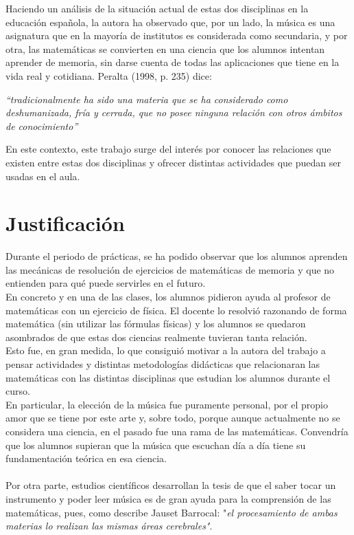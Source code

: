\documentclass[a4paper, openright, 11pt, titlepage]{report}
\theoremstyle{definition}\newtheorem{defin}[propo]{Definition}
\theoremstyle{definition}\newtheorem{obser}[propo]{Remark}
\theoremstyle{definition}\newtheorem{ejem}[propo]{Ejemplo}
\theoremstyle{definition}\newtheorem{algoritmo}[propo]{Algoritmo}
\begin{document}
Haciendo un análisis de la situación actual de estas dos disciplinas en la educación española, la autora ha observado que, por un lado, la música es una asignatura que en la mayoría de institutos es considerada como secundaria, y por otra, las matemáticas se convierten en una ciencia que los alumnos intentan aprender de memoria, sin darse cuenta de todas las aplicaciones que tiene en la vida real y cotidiana. Peralta (1998, p. 235) dice:
\begin{center}
    \textit{“tradicionalmente ha sido una materia que se ha considerado como deshumanizada, fría y cerrada, que no posee ninguna relación con otros ámbitos de conocimiento”}
\end{center}
En este contexto, este trabajo surge del interés por conocer las relaciones que existen entre estas dos disciplinas y ofrecer distintas actividades que puedan ser usadas en el aula. 

\section{Justificación}
Durante el periodo de prácticas, se ha podido observar que los alumnos aprenden las mecánicas de resolución de ejercicios de matemáticas de memoria y que no entienden para qué puede servirles en el futuro.\\
En concreto y en una de las clases, los alumnos pidieron ayuda al profesor de matemáticas con un ejercicio de física. El docente lo resolvió razonando de forma matemática (sin utilizar las fórmulas físicas) y los alumnos se quedaron asombrados de que estas dos ciencias realmente tuvieran tanta relación.\\
Esto fue, en gran medida, lo que consiguió motivar a la autora del trabajo a pensar actividades y distintas metodologías didácticas que relacionaran las matemáticas con las distintas disciplinas que estudian los alumnos durante el curso.\\
En particular, la elección de la música fue puramente personal, por el propio amor que se tiene por este arte y, sobre todo, porque aunque actualmente no se considera una ciencia, en el pasado fue una rama de las matemáticas. Convendría que los alumnos supieran que la música que escuchan día a día tiene su fundamentación teórica en esa ciencia.\\\\
Por otra parte, estudios científicos desarrollan la tesis de que el saber tocar un instrumento y poder leer música es de gran ayuda para la comprensión de las matemáticas, pues, como describe Jauset Barrocal: "\textit{el procesamiento de ambas materias lo realizan las mismas áreas cerebrales"}.
 
\end{document}
